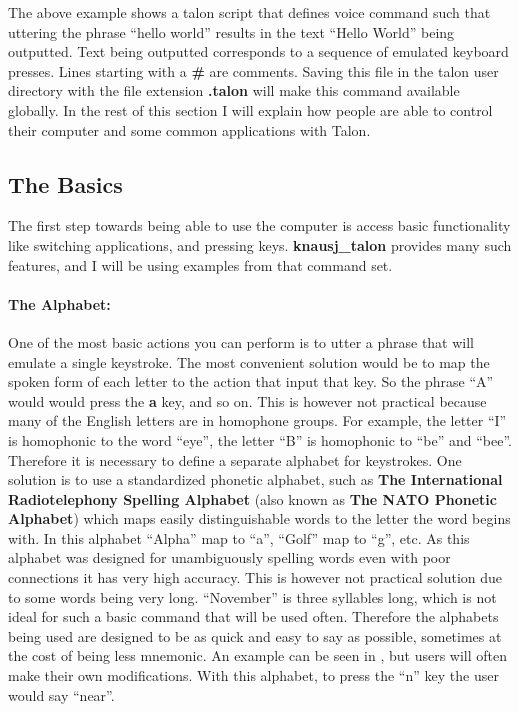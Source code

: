 \documentclass[../thesis.tex]{subfiles}
\begin{document}
The above example shows a talon script that defines voice command such that uttering the phrase ``hello world''
results in the text ``Hello World'' being outputted.
Text being outputted corresponds to
a sequence of emulated keyboard presses.
Lines starting with a \textbf{\#} are comments.
Saving this file in the talon user directory with the file extension \textbf{.talon} will make this command available globally.
In the rest of this section I will explain how people are able to control their computer and some common applications with Talon.

\subsection{The Basics}
The first step towards being able to use the computer is access basic functionality like switching applications, and pressing keys.
\textbf{knausj\_talon} provides many such features, and I will be using examples from that command set.

\paragraph{The Alphabet:}
One of the most basic actions you can perform is to utter a phrase that will emulate a single keystroke.
The most convenient solution would be to map the spoken form of each letter to the action that input that key.
So the phrase ``A'' would would press the \textbf{a} key, and so on.
This is however not practical because many of the English letters are in homophone groups.
For example, the letter ``I'' is homophonic to the word ``eye'', the letter ``B'' is homophonic to ``be'' and ``bee''.
Therefore it is necessary to define a separate alphabet for keystrokes.
One solution is to use a standardized phonetic alphabet, such as \textbf{The International Radiotelephony Spelling Alphabet}
(also known as \textbf{The NATO Phonetic Alphabet}) which maps easily distinguishable words to the letter the word begins with.
In this alphabet ``Alpha'' map to ``a'', ``Golf'' map to ``g'', etc.
As this alphabet was designed for unambiguously spelling words even with poor connections it has very high accuracy.
This is however not practical solution due to some words being very long. ``November'' is three syllables long, which
is not ideal for such a basic command that will be used often.
Therefore the alphabets being used are designed to be as quick and easy to say as possible, sometimes at the cost of
being less mnemonic. An example can be seen in , but users will often make their own
modifications. With this alphabet, to press the ``n'' key the user would say ``near''.
\end{document}
